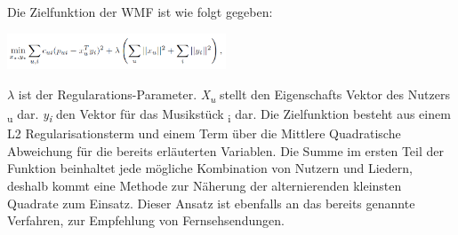 \documentclass[twosided,a4,10pt]{article}
\begin{document}
\begin{multicols}{2}
		Die Zielfunktion der WMF ist wie folgt gegeben:
		
		\begin{minipage}{0.2\textwidth}
			\centering
			\includegraphics[width=6.5cm]{img/Zielfunktion.png}
		\end{minipage}\newline
		$\lambda$ ist der Regularations-Parameter. \textit{X\textsubscript{u}} stellt den Eigenschafts Vektor des Nutzers \textsubscript{u} dar. \textit{y\textsubscript{i}} den Vektor für das Musikstück \textsubscript{i} dar. Die Zielfunktion besteht aus einem L2 Regularisationsterm und einem Term über die Mittlere Quadratische Abweichung für die bereits erläuterten Variablen. Die Summe im ersten Teil der Funktion beinhaltet jede mögliche Kombination von Nutzern und Liedern, deshalb kommt eine Methode zur Näherung der alternierenden kleinsten Quadrate zum Einsatz. Dieser Ansatz ist ebenfalls an das bereits genannte Verfahren, zur Empfehlung von Fernsehsendungen.\cite{oord} 
		

\end{multicols}
\end{document}
